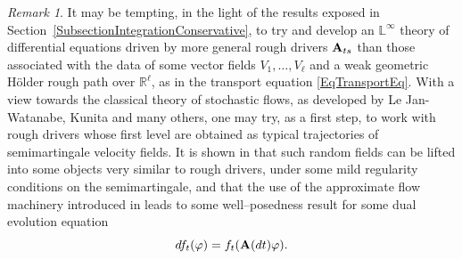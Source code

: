 \documentclass[11pt,a4paper]{amsart}
\newcommand{\RR}{\mathbb{R}}  \newcommand{\CC}{\mathbb{C}}  \newcommand{\LL}{\mathbb{L}}  \newcommand{\WW}{\mathbb{W}}
\theoremstyle{plain}%
\theoremstyle{definition}
\theoremstyle{remark}
\newtheorem{remark}[theorem]{Remark}
\numberwithin{equation}{section} %
\begin{document}
\begin{remark}
It may be tempting, in the light of the results exposed in Section~\ref{SubsectionIntegrationConservative}, to try and develop an $\LL^\infty$ theory of differential equations driven by more general rough drivers ${\bf A}_{ts}$ than those associated with the data of some vector fields $V_1,\dots, V_\ell$ and a weak geometric H\"older rough path over $\RR^\ell$, as in the transport equation \eqref{EqTransportEq}. With a view towards the classical theory of stochastic flows, as developed by Le Jan-Watanabe, Kunita and many others, one may try, as a first step, to work with rough drivers whose first level are obtained as typical trajectories of semimartingale velocity fields. It is shown in \cite{BailleulRiedel} that such random fields can be lifted into some objects very similar to rough drivers, under some mild regularity conditions on the semimartingale, and that the use of the approximate flow machinery introduced in \cite{BailleulRMI} leads to some well--posedness result for some dual evolution equation 
$$
df_t(\varphi) = f_t({\bf A}(dt)\varphi) .   
$$ 
\end{remark}



\bigskip
\end{document}
